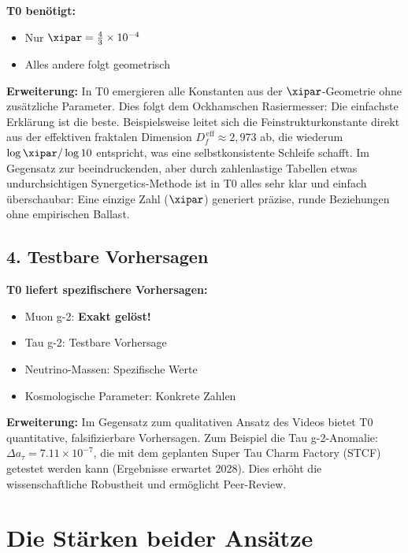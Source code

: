 	\textbf{T0 benötigt:}
	\begin{itemize}
		\item Nur $\xipar = \frac{4}{3} \times 10^{-4}$
		\item Alles andere folgt geometrisch
	\end{itemize}
	
	\textbf{Erweiterung:} In T0 emergieren alle Konstanten aus der $\xipar$-Geometrie ohne zusätzliche Parameter. Dies folgt dem Ockhamschen Rasiermesser: Die einfachste Erklärung ist die beste. Beispielsweise leitet sich die Feinstrukturkonstante direkt aus der effektiven fraktalen Dimension $D_f^{\,\text{eff}} \approx 2{,}973$ ab, die wiederum $\log \xipar / \log 10$ entspricht, was eine selbstkonsistente Schleife schafft. Im Gegensatz zur beeindruckenden, aber durch zahlenlastige Tabellen etwas undurchsichtigen Synergetics-Methode ist in T0 alles sehr klar und einfach überschaubar: Eine einzige Zahl ($\xipar$) generiert präzise, runde Beziehungen ohne empirischen Ballast.
	
	\subsection{4. Testbare Vorhersagen}
	
	\begin{vorteil}
		\textbf{T0 liefert spezifischere Vorhersagen:}
		\begin{itemize}
			\item Muon g-2: \textbf{Exakt gelöst!}
			\item Tau g-2: Testbare Vorhersage
			\item Neutrino-Massen: Spezifische Werte
			\item Kosmologische Parameter: Konkrete Zahlen
		\end{itemize}
		
		\textbf{Erweiterung:} Im Gegensatz zum qualitativen Ansatz des Videos bietet T0 quantitative, falsifizierbare Vorhersagen. Zum Beispiel die Tau g-2-Anomalie: $\Delta a_\tau = 7.11 \times 10^{-7}$, die mit dem geplanten Super Tau Charm Factory (STCF) getestet werden kann (Ergebnisse erwartet 2028). Dies erhöht die wissenschaftliche Robustheit und ermöglicht Peer-Review.
	\end{vorteil}
	
	\section{Die Stärken beider Ansätze}
	
